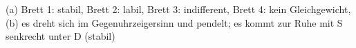 (a) Brett 1: stabil, Brett 2: labil, Brett 3: indifferent, Brett 4: kein Gleichgewicht, (b) es dreht sich im Gegenuhrzeigersinn und pendelt; es kommt zur Ruhe mit S senkrecht unter D (stabil)
